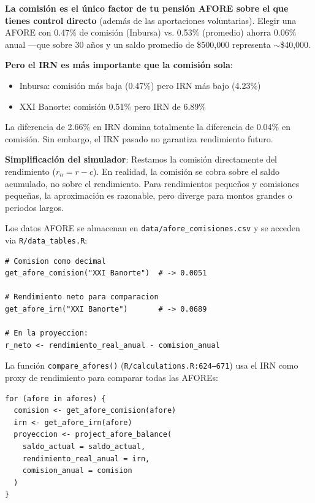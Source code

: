 \documentclass[11pt,a4paper]{report}
\begin{document}
\begin{tcolorbox}[colback=green!5!white, colframe=green!50!black, title=\textbf{Intuici\'on}]
\textbf{La comisi\'on es el \'unico factor de tu pensi\'on AFORE sobre el que tienes control directo} (adem\'as de las aportaciones voluntarias). Elegir una AFORE con 0.47\% de comisi\'on (Inbursa) vs. 0.53\% (promedio) ahorra 0.06\% anual ---que sobre 30 a\~nos y un saldo promedio de \$500,000 representa $\sim$\$40,000.

\textbf{Pero el IRN es m\'as importante que la comisi\'on sola}:\\
\begin{itemize}[nosep]
\item Inbursa: comisi\'on m\'as baja (0.47\%) pero IRN m\'as bajo (4.23\%)
\item XXI Banorte: comisi\'on 0.51\% pero IRN de 6.89\%
\end{itemize}
La diferencia de 2.66\% en IRN domina totalmente la diferencia de 0.04\% en comisi\'on. Sin embargo, el IRN pasado no garantiza rendimiento futuro.

\textbf{Simplificaci\'on del simulador}: Restamos la comisi\'on directamente del rendimiento ($r_n = r - c$). En realidad, la comisi\'on se cobra sobre el saldo acumulado, no sobre el rendimiento. Para rendimientos peque\~nos y comisiones peque\~nas, la aproximaci\'on es razonable, pero diverge para montos grandes o periodos largos.
\end{tcolorbox}

\begin{tcolorbox}[colback=orange!5!white, colframe=orange!75!black, title=\textbf{Aplicaci\'on en C\'odigo}]
Los datos AFORE se almacenan en \texttt{data/afore\_comisiones.csv} y se acceden via \texttt{R/data\_tables.R}:

\begin{lstlisting}
# Comision como decimal
get_afore_comision("XXI Banorte")  # -> 0.0051

# Rendimiento neto para comparacion
get_afore_irn("XXI Banorte")       # -> 0.0689

# En la proyeccion:
r_neto <- rendimiento_real_anual - comision_anual
\end{lstlisting}

La funci\'on \texttt{compare\_afores()} (\texttt{R/calculations.R:624--671}) usa el IRN como proxy de rendimiento para comparar todas las AFOREs:
\begin{lstlisting}
for (afore in afores) {
  comision <- get_afore_comision(afore)
  irn <- get_afore_irn(afore)
  proyeccion <- project_afore_balance(
    saldo_actual = saldo_actual,
    rendimiento_real_anual = irn,
    comision_anual = comision
  )
}
\end{lstlisting}
\end{tcolorbox}
\end{document}
